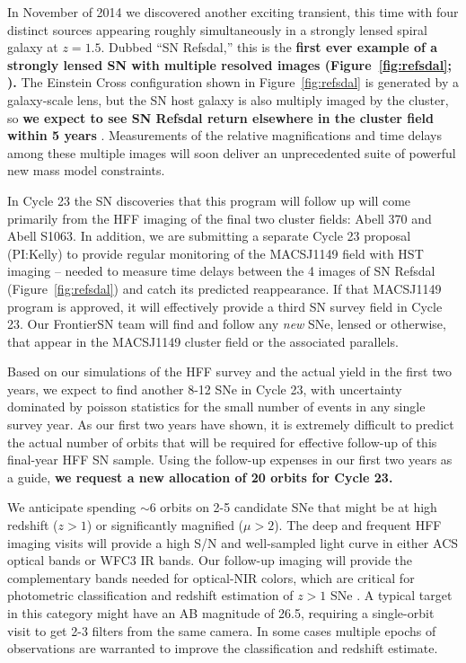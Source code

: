 \documentclass[12pt]{article}
\begin{document}
In November of 2014 we discovered another exciting transient, this
time with four distinct sources appearing roughly simultaneously in a
strongly lensed spiral galaxy at $z=1.5$.  Dubbed ``SN Refsdal,'' this
is the {\bf first ever example of a strongly lensed SN with multiple
  resolved images (Figure~\ref{fig:refsdal}; \citealt{Kelly:2015}).}
The Einstein Cross configuration shown in Figure~\ref{fig:refsdal} is
generated by a galaxy-scale lens, but the SN host galaxy is also
multiply imaged by the cluster, so {\bf we expect to see SN Refsdal
  return elsewhere in the cluster field within 5 years}
\citep{Oguri:2015,Sharon:2015}.  Measurements of the relative
magnifications and time delays among these multiple images will soon
deliver an unprecedented suite of powerful new mass model constraints.



%
%
\describeobservations   %

In Cycle 23 the SN discoveries that this program will follow up will
come primarily from the HFF imaging of the final two cluster fields:
Abell 370 and Abell S1063. In addition, we are submitting a separate
Cycle 23 proposal (PI:Kelly) to provide regular monitoring of the
MACSJ1149 field with HST imaging -- needed to
measure time delays between the 4 images of SN Refsdal
(Figure~\ref{fig:refsdal}) and catch its predicted reappearance.  If
that MACSJ1149 program is approved, it will effectively provide a
third SN survey field in Cycle 23. Our FrontierSN team will find
and follow any {\it new} SNe, lensed or otherwise, that appear in the
MACSJ1149 cluster field or the associated parallels.

Based on our simulations of the HFF survey and the actual yield in the
first two years, we expect to find another 8-12 SNe in Cycle 23, with
uncertainty dominated by poisson statistics for the small number of
events in any single survey year.  As our first two years have shown,
it is extremely difficult to predict the actual number of orbits
that will be required for effective follow-up of this final-year HFF
SN sample.  Using the follow-up expenses in our first two years as a
guide, {\bf we request a new allocation of 20 orbits for Cycle 23.}

We anticipate spending $\sim$6 orbits on 2-5 candidate SNe that might
be at high redshift ($z>1$) or significantly magnified ($\mu>2$).  The
deep and frequent HFF imaging visits will provide a high S/N and
well-sampled light curve in either ACS optical bands or WFC3 IR bands.
Our follow-up imaging will provide the complementary bands needed for
optical-NIR colors, which are critical for photometric classification
and redshift estimation of $z>1$ SNe \citep{Riess:2004a,Rodney:2012}.
A typical target in this category might have an AB magnitude of 26.5,
requiring a single-orbit visit to get 2-3 filters from the same
camera.  In some cases multiple epochs of observations are warranted
to improve the classification and redshift estimate.
\end{document}
